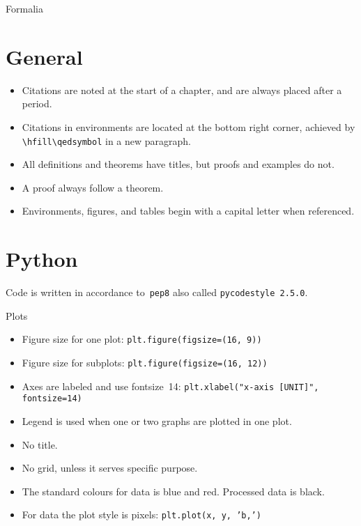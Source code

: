\begin{center}
{\HUGE Formalia}
\end{center}
\section{General}
\begin{itemize}
    \item Citations are noted at the start of a chapter, and are always placed after a period.
    \item Citations in environments are located at the bottom right corner, achieved by \texttt{\backslash hfill\backslash qedsymbol} in a new paragraph.
    \item All definitions and theorems have titles, but proofs and examples do not.
    \item A proof always follow a theorem.
    \item Environments, figures, and tables begin with a capital letter when referenced.
\end{itemize}

\section{Python}
Code is written in accordance to~\texttt{pep8} also called \texttt{pycodestyle 2.5.0}.

Plots
\begin{itemize}
    \item Figure size for one plot: \hfill\texttt{plt.figure(figsize=(16, 9))}
    \item Figure size for subplots: \hfill\texttt{plt.figure(figsize=(16, 12))}
    \item Axes are labeled and use fontsize~14: \hfill\texttt{plt.xlabel("x-axis [UNIT]", fontsize=14)}
    \item Legend is used when one or two graphs are plotted in one plot.
    \item No title.
    \item No grid, unless it serves specific purpose.
    \item The standard colours for data is blue and red. Processed data is black.
    \item For data the plot style is pixels: \hfill\texttt{plt.plot(x, y, 'b,')}
\end{itemize}
